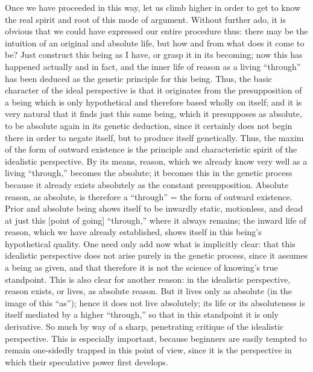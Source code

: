 Once we have proceeded in this way,
let us climb higher in order to get
to know the real spirit and root
of this mode of argument.
Without further ado,
it is obvious that we could have expressed our entire procedure thus:
there may be the intuition of an original and absolute life,
but how and from what does it come to be?
Just construct this being as I have,
or grasp it in its becoming;
now this has happened actually and in fact,
and the inner life of reason as a living “through”
has been deduced as the genetic principle for this being.
Thus, the basic character of the ideal perspective is
that it originates from the presupposition of
a being which is only hypothetical
and therefore based wholly on itself;
and it is very natural that it finds just this same being,
which it presupposes as absolute,
to be absolute again in its genetic deduction,
since it certainly does not begin there
in order to negate itself,
but to produce itself genetically.
Thus, the maxim of the form of outward existence is
the principle and characteristic spirit
of the idealistic perspective.
By its means, reason, which we already know very well
as a living “through,” becomes the absolute;
it becomes this in the genetic process
because it already exists absolutely
as the constant presupposition.
Absolute reason, as absolute, is therefore a “through” =
the form of outward existence.
Prior and absolute being shows itself to be
inwardly static, motionless, and dead
at just this [point of going] “through,”
where it always remains;
the inward life of reason,
which we have already established,
shows itself in this being’s hypothetical quality.
One need only add now what is implicitly clear:
that this idealistic perspective does not arise
purely in the genetic process,
since it assumes a being as given,
and that therefore it is not
the science of knowing’s true standpoint.
This is also clear for another reason:
in the idealistic perspective, reason exists,
or lives, as absolute reason.
But it lives only as absolute
(in the image of this “as”);
hence it does not live absolutely;
its life or its absoluteness is itself mediated by
a higher “through,”
so that in this standpoint it is only derivative.
So much by  way of a sharp, penetrating
critique of the idealistic perspective.
This is especially important,
because beginners are easily tempted to remain
one-sidedly trapped in this point of view,
since it is the perspective in which
their speculative power first develops.

